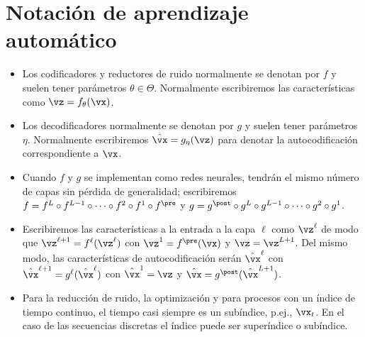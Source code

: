 \documentclass[../book-main_es.tex]{subfiles}
\begin{document}
\section*{Notación de aprendizaje automático}

\begin{itemize}
    \item Los codificadores y reductores de ruido normalmente se denotan por 
        \(f\) y suelen tener parámetros \(\theta \in \Theta\). Normalmente
        escribiremos las características como \(\vz = f_{\theta}(\vx)\).
    \item Los decodificadores normalmente se denotan por \(g\) y suelen 
        tener parámetros \(\eta\). Normalmente escribiremos 
        \(\hat{\vx} = g_{\eta}(\vz)\) para denotar la autocodificación correspondiente a \(\vx\).
    \item Cuando \(f\) y \(g\) se implementan como redes neurales,
        tendrán el mismo número de capas sin pérdida de generalidad;
        escribiremos \(f = f^{L} \circ f^{L - 1}
        \circ \cdots \circ f^{2} \circ f^{1} \circ f^{\pre}\) y \(g
            = g^{\post} \circ g^{L} \circ g^{ L - 1} \circ \cdots \circ
        g^{2} \circ g^{1}\).
    \item Escribiremos las características a la entrada a la capa \(\ell\) como
        \(\vz^{\ell}\) de modo que \(\vz^{\ell + 1} =
        f^{\ell}(\vz^{\ell})\) con \(\vz^{1} = f^{\pre}(\vx)\) y
        \(\vz = \vz^{L + 1}\). Del mismo modo, las características de autocodificación 
        serán \(\hat{\vx}^{\ell}\) con \(\hat{\vx}^{\ell + 1} =
        g^{\ell}(\hat{\vx}^{\ell})\) con \(\hat{\vx}^{1} = \vz\) y
        \(\hat{\vx} = g^{\post}(\hat{\vx}^{L + 1})\).
    \item Para la reducción de ruido, la optimización y para procesos con un
        índice de tiempo continuo, el tiempo casi siempre es un subíndice,
        p.ej., \(\vx_{t}\). En el caso de las secuencias discretas el índice puede ser
        superíndice o subíndice.
\end{itemize}
\end{document}
